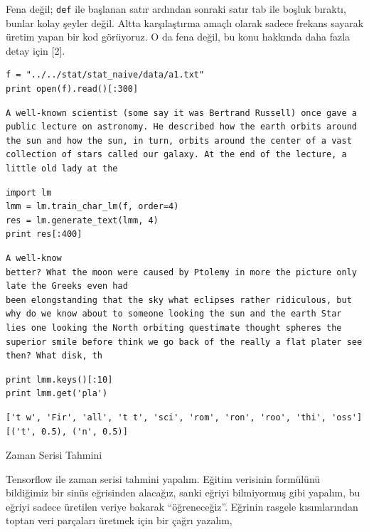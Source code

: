 \documentclass[12pt,fleqn]{article}\usepackage{../../common}
\begin{document}
Fena değil; \verb!def! ile başlanan satır ardından sonraki satır tab ile
boşluk bıraktı, bunlar kolay şeyler değil.  Altta karşılaştırma amaçlı
olarak sadece frekans sayarak üretim yapan bir kod görüyoruz. O da fena
değil, bu konu hakkında daha fazla detay için [2].

\begin{verbatim}
f = "../../stat/stat_naive/data/a1.txt"
print open(f).read()[:300]
\end{verbatim}

\begin{verbatim}
A well-known scientist (some say it was Bertrand Russell) once gave a
public lecture on astronomy. He described how the earth orbits around
the sun and how the sun, in turn, orbits around the center of a vast
collection of stars called our galaxy. At the end of the lecture, a
little old lady at the 
\end{verbatim}

\begin{verbatim}
import lm
lmm = lm.train_char_lm(f, order=4)
res = lm.generate_text(lmm, 4)
print res[:400]
\end{verbatim}

\begin{verbatim}
A well-know
better? What the moon were caused by Ptolemy in more the picture only late the Greeks even had
been elongstanding that the sky what eclipses rather ridiculous, but why do we know about to someone looking the sun and the earth Star
lies one looking the North orbiting questimate thought spheres the superior smile before think we go back of the really a flat plater see then? What disk, th
\end{verbatim}


\begin{verbatim}
print lmm.keys()[:10]
print lmm.get('pla')
\end{verbatim}

\begin{verbatim}
['t w', 'Fir', 'all', 't t', 'sci', 'rom', 'ron', 'roo', 'thi', 'oss']
[('t', 0.5), ('n', 0.5)]
\end{verbatim}

Zaman Serisi Tahmini

Tensorflow ile zaman serisi tahmini yapalım. Eğitim verisinin formülünü
bildiğimiz bir sinüs eğrisinden alacağız, sanki eğriyi bilmiyormuş gibi
yapalım, bu eğriyi sadece üretilen veriye bakarak ``öğreneceğiz''. Eğrinin
rasgele kısımlarından toptan veri parçaları üretmek için bir çağrı yazalım,
\end{document}
